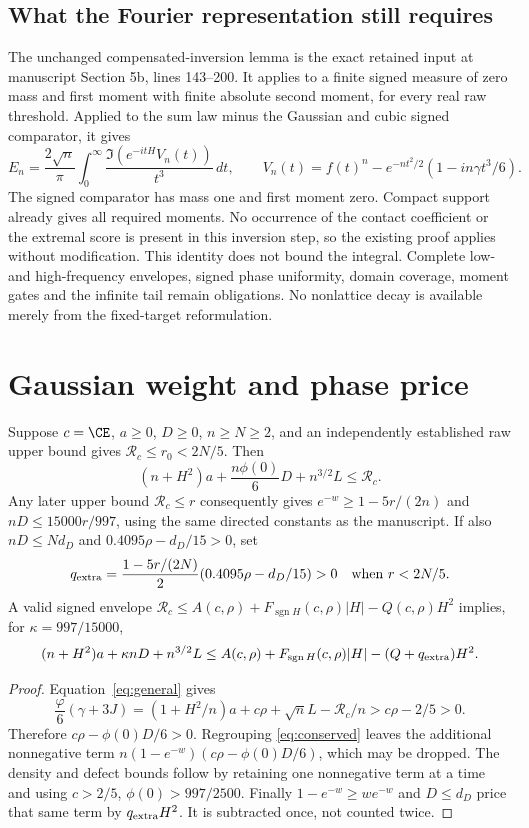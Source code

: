 \subsection{What the Fourier representation still requires}
The unchanged compensated-inversion lemma is the exact retained input
at manuscript Section 5b, lines 143--200. It applies to a finite signed
measure of zero mass and first moment with finite absolute second moment,
for every real raw threshold. Applied to the sum law minus the Gaussian
and cubic signed comparator, it gives
\[
 E_n=\frac{2\sqrt n}{\pi}\int_0^\infty
     \frac{\Im(e^{-itH}V_n(t))}{t^3}\,dt,
 \qquad V_n(t)=f(t)^n-e^{-nt^2/2}(1-in\gamma t^3/6).
\]
The signed comparator has mass one and first moment zero. Compact support
already gives all required moments. No occurrence of the contact
coefficient or the extremal score is present in this inversion step, so
the existing proof applies without modification.
This identity does not bound the integral. Complete low- and
high-frequency envelopes, signed phase uniformity, domain coverage,
moment gates and the infinite tail remain obligations. No nonlattice
decay is available merely from the fixed-target reformulation.

\section{Gaussian weight and phase price}
\begin{corollary}\label{cor:weight}
Suppose $c=\CE$, $a\ge0$, $D\ge0$, $n\ge N\ge2$, and an independently
established raw upper bound gives $\mathcal R_c\le r_0<2N/5$. Then
\[
 (n+H^2)a+\frac{n\phi(0)}6D+n^{3/2}L\le\mathcal R_c.
\]
Any later upper bound $\mathcal R_c\le r$ consequently gives
$e^{-w}\ge1-5r/(2n)$ and $nD\le15000r/997$, using the same directed
constants as the manuscript. If also $nD\le Nd_D$ and
$0.4095\rho-d_D/15>0$, set
\[
 q_{\rm extra}=\frac{1-5r/(2N)}2(0.4095\rho-d_D/15)>0
 \quad\text{when } r<2N/5.
\]
A valid signed envelope
$\mathcal R_c\le A(c,\rho)+F_{\operatorname{sgn}H}(c,\rho)|H|
-Q(c,\rho)H^2$ implies, for $\kappa=997/15000$,
\[
 (n+H^2)a+\kappa nD+n^{3/2}L
 \le A(c,\rho)+F_{\operatorname{sgn}H}(c,\rho)|H|
                       -(Q+q_{\rm extra})H^2.
\]
\end{corollary}
\begin{proof}
Equation~\eqref{eq:general} gives
\[
 \frac{\varphi}{6}(\gamma+3J)
 =(1+H^2/n)a+c\rho+\sqrt nL-\mathcal R_c/n
 >c\rho-2/5>0.
\]
Therefore $c\rho-\phi(0)D/6>0$. Regrouping
\eqref{eq:conserved} leaves the additional nonnegative term
$n(1-e^{-w})(c\rho-\phi(0)D/6)$, which may be dropped. The density and
defect bounds follow by retaining one nonnegative term at a time and
using $c>2/5$, $\phi(0)>997/2500$. Finally
$1-e^{-w}\ge we^{-w}$ and $D\le d_D$ price that same term by
$q_{\rm extra}H^2$. It is subtracted once, not counted twice.
\end{proof}

